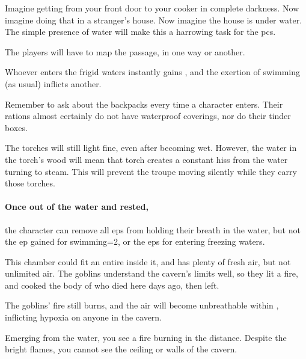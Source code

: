 \begin{multicols}{2}
Imagine getting from your front door to your cooker in complete darkness.
Now imagine doing that in a stranger's house.
Now imagine the house is under water.
The simple presence of water will make this a harrowing task for the \glspl{pc}.

The players will have to map the passage, in one way or another.

Whoever enters the frigid waters instantly gains , and the exertion of swimming (as usual) inflicts another.

Remember to ask about the backpacks every time a character enters.
Their \glspl{ration} almost certainly do not have waterproof coverings, nor do their tinder boxes.

The torches will still light fine, even after becoming wet.
However, the water in the torch's wood will mean that torch creates a constant hiss from the water turning to steam.
This will prevent the troupe moving silently while they carry those torches.


\paragraph{Once out of the water and rested,}
the character can remove all \glspl{ep} from holding their breath in the water, but not the \gls{ep} gained for swimming\ifnum\value{temperature}=2\else, or the \glspl{ep} for entering freezing waters\fi.




\begin{exampletext}
  This chamber could fit an entire  inside it, and has plenty of fresh air, but not unlimited air.
  The goblins understand the cavern's limits well, so they lit a fire, and cooked the body of  who died here days ago, then left.
\end{exampletext}

The goblins' fire still burns, and the air will become unbreathable within , inflicting \gls{hypoxia} on anyone in the cavern.

\begin{boxtext}
  Emerging from the water, you see a fire burning in the distance.
  Despite the bright flames, you cannot see the ceiling or walls of the cavern.
\end{boxtext}


\end{multicols}
